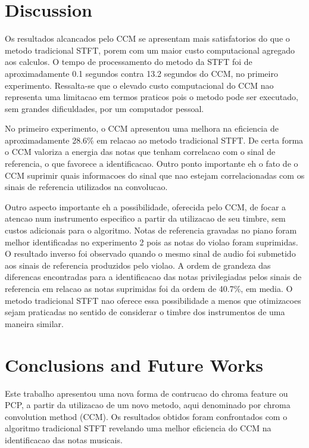 \documentclass{article}
\begin{document}
\section{Discussion}\label{sec:discussion}

	Os resultados alcancados pelo CCM se apresentam mais satisfatorios do que o metodo tradicional STFT, porem com um maior custo computacional agregado aos calculos. O tempo de processamento do metodo da STFT foi de aproximadamente 0.1 segundos contra 13.2 segundos do CCM, no primeiro experimento. Ressalta-se que o elevado custo computacional do CCM nao representa uma limitacao em termos praticos pois o metodo pode ser executado, sem grandes dificuldades, por um computador pessoal.

	No primeiro experimento, o CCM apresentou uma melhora na eficiencia de aproximadamente 28.6\% em relacao ao metodo tradicional STFT. De certa forma o CCM valoriza a energia das notas que tenham correlacao com o sinal de referencia, o que favorece a identificacao. Outro ponto importante eh o fato de o CCM suprimir quais informacoes do sinal que nao estejam correlacionadas com os sinais de referencia utilizados na convolucao. 

	Outro aspecto importante eh a possibilidade, oferecida pelo CCM, de focar a atencao num instrumento especifico a partir da utilizacao de seu timbre, sem custos adicionais para o algoritmo. Notas de referencia gravadas no piano foram melhor identificadas no experimento 2 pois as notas do violao foram suprimidas. O resultado inverso foi observado quando o mesmo sinal de audio foi submetido aos sinais de referencia produzidos pelo violao. A ordem de grandeza das diferencas encontradas para a identificacao das notas privilegiadas pelos sinais de referencia em relacao as notas suprimidas foi da ordem de 40.7\%, em media. O metodo tradicional STFT nao oferece essa possibilidade a menos que otimizacoes sejam praticadas no sentido de considerar o timbre dos instrumentos de uma maneira similar.


	\section{Conclusions and Future Works}\label{sec:conclusions}

	Este trabalho apresentou uma nova forma de contrucao do chroma feature ou PCP, a partir da utilizacao de um novo metodo, aqui denominado por chroma convolution method (CCM). Os resultados obtidos foram confrontados com o algoritmo tradicional STFT revelando uma melhor eficiencia do CCM na identificacao das notas musicais.
\end{document}

